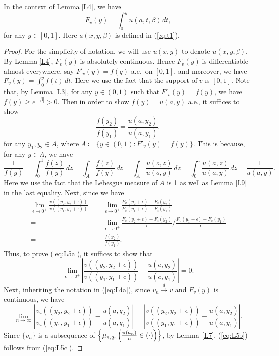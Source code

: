\begin{lemma}\label{L5}
In the context of Lemma \ref{L4}, we have
\[
F_v(y) = \int_{0}^{y} u(a, t, \beta)\, dt,
\]
for any $y \in [0, 1]$. Here $u(x, y, \beta)$ is defined in (\ref{eq:t1}).
\end{lemma}
\begin{proof}
For the simplicity of notation, we will use $u(x, y)$ to denote $u(x, y, \beta)$. By Lemma \ref{L4}, $F_v(y)$ is absolutely continuous. Hence $F_v(y)$ is differentiable almost
everywhere, say $F'_v(y) = f(y)$ a.e.\ on $[0, 1]$, and moreover, we have $F_v(y) = \int_{0}^{y} f(t) \, dt$. Here we use the fact that the support of $v$ is $[0, 1]$.
Note that, by Lemma \ref{L3}, for any $y \in (0, 1)$ such that $F'_v(y) = f(y)$, we have $f(y) \ge e^{-|\beta|} > 0$.
Then in order to show $f(y) = u(a, y)$ a.e., it suffices to show
\begin{equation}
\frac{f(y_2)}{f(y_1)} = \frac{u(a, y_2)}{u(a, y_1)}, \label{eq:L5a}
\end{equation}
for any $y_1, y_2 \in A$, where $A \coloneqq \{ y\in (0,1): F'_v(y) = f(y)\}$. This is because, for any $y \in A$, we have
\[
\textstyle\frac{1}{f(y)} = \int_{0}^{1} \frac{f(z)}{f(y)} \, dz = \int_{A} \frac{f(z)}{f(y)} \, dz
= \int_{A} \frac{u(a,z)}{u(a,y)} \, dz = \int_{0}^{1} \frac{u(a,z)}{u(a,y)} \, dz = \frac{1}{u(a, y)}.
\]
Here we use the fact that the Lebesgue measure of $A$ is 1 as well as Lemma \ref{L9} in the last equality.
Next, since we have
\begin{align*}
\lim_{\epsilon \to 0^+} \frac{v((y_2, y_2+\epsilon))}{v((y_1, y_1+\epsilon))}
=& \lim_{\epsilon \to 0^+} \frac{F_v(y_2+\epsilon) - F_v(y_2)}{F_v(y_1+\epsilon) - F_v(y_1)}\\
=& \lim_{\epsilon \to 0^+} \frac{F_v(y_2+\epsilon) - F_v(y_2)}{\epsilon}\Big/\frac{F_v(y_1+\epsilon) - F_v(y_1)}{\epsilon}\\
=&\, \frac{f(y_2)}{f(y_1)}.
\end{align*}
Thus, to prove (\ref{eq:L5a}), it suffices to show that
\begin{equation}
\lim_{\epsilon \to 0^+} \left|\frac{v((y_2, y_2+\epsilon))}{v((y_1, y_1+\epsilon))} - \frac{u(a, y_2)}{u(a, y_1)}\right| = 0. \label{eq:L5b}
\end{equation}
Next, inheriting the notation in (\ref{eq:L4a}),  since $v_n \overset{d}{\longrightarrow} v$ and $F_v(y)$ is continuous, we have
\begin{equation}
\lim_{n \to \infty} \left| \frac{v_n((y_2, y_2+\epsilon))}{v_n((y_1, y_1+\epsilon))} - \frac{u(a, y_2)}{u(a, y_1)} \right|
= \left| \frac{v((y_2, y_2+\epsilon))}{v((y_1, y_1+\epsilon))} - \frac{u(a, y_2)}{u(a, y_1)} \right|. \label{eq:L5c}
\end{equation}
Since $\{v_n\}$ is a subsequence of $\textstyle\Big\{ \mu_{n, q_n} \Big( \frac{\pi(a_n)}{n} \in (\cdot) \Big) \Big\}$, by Lemma~\ref{L7}, (\ref{eq:L5b}) follows from (\ref{eq:L5c}).
\end{proof}



